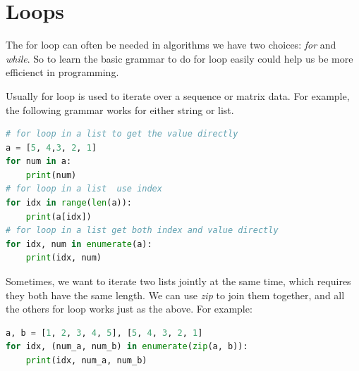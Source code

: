 \documentclass[../main.tex]{subfiles}
\begin{document}
\section{Loops}
The for loop can often be needed in algorithms we have two choices: 
\textit{for} and \textit{while}. So to learn the basic grammar to do for loop easily could help us be more efficienct in programming. 

Usually for loop is used to iterate over a sequence or matrix data. For example, the following grammar works for either string or list. 
\begin{lstlisting}[language=python]
# for loop in a list to get the value directly
a = [5, 4,3, 2, 1]
for num in a:
    print(num)
# for loop in a list  use index
for idx in range(len(a)):
    print(a[idx])
# for loop in a list get both index and value directly
for idx, num in enumerate(a):
    print(idx, num)
\end{lstlisting}
Sometimes, we want to iterate two lists jointly at the same time, which requires they both have the same length. We can use \textit{zip} to join them together, and all the others for loop works just as the above. For example:
\begin{lstlisting}[language=Python]
a, b = [1, 2, 3, 4, 5], [5, 4, 3, 2, 1]
for idx, (num_a, num_b) in enumerate(zip(a, b)):
    print(idx, num_a, num_b)
\end{lstlisting}
\end{document}
